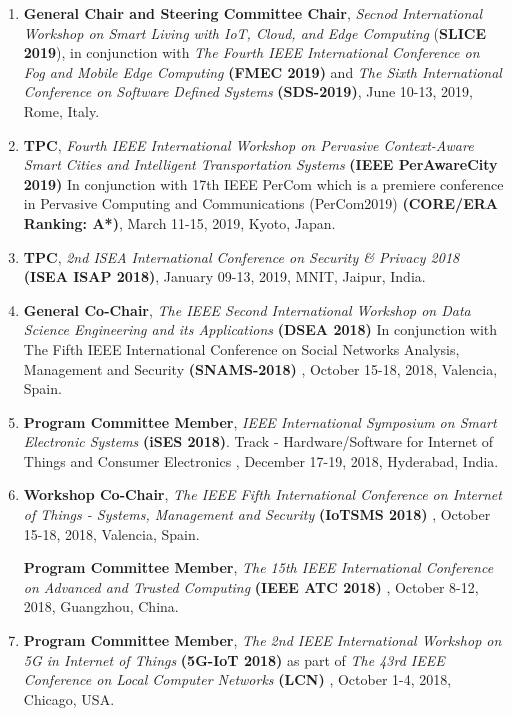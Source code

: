 \begin{enumerate}
\item
\textbf{General Chair and Steering Committee Chair}, \textit{Secnod International Workshop on Smart Living with IoT, Cloud, and Edge Computing }(\textbf{SLICE 2019}), in conjunction with \textit{The Fourth IEEE International Conference on Fog and Mobile Edge Computing} \textbf{(FMEC 2019)} and \textit{The Sixth International Conference on Software Defined Systems} \textbf{(SDS-2019)}, June 10-13, 2019, Rome, Italy.

\item
\textbf{TPC}, \textit{Fourth IEEE International Workshop on Pervasive Context-Aware Smart Cities and Intelligent Transportation Systems} \textbf{(IEEE PerAwareCity 2019)} In conjunction with 17th IEEE PerCom which is a premiere conference in Pervasive Computing and Communications (PerCom2019) \textbf{(CORE/ERA Ranking: A*)}, March 11-15, 2019, Kyoto, Japan.

\item
\textbf{TPC}, \textit{2nd ISEA International Conference on Security \& Privacy 2018} \textbf{(ISEA ISAP 2018)}, January 09-13, 2019, MNIT, Jaipur, India.

\item
\textbf{General Co-Chair}, \textit{The IEEE Second International Workshop on Data Science Engineering and its Applications} \textbf{(DSEA 2018)} In conjunction with 
The Fifth IEEE International Conference on Social Networks Analysis, Management and Security \textbf{(SNAMS-2018) }, October 15-18, 2018, Valencia, Spain.

\item
\textbf{Program Committee Member}, \textit{IEEE International Symposium on Smart Electronic Systems} \textbf{(iSES 2018)}. Track - Hardware/Software for Internet of Things and Consumer Electronics , December 17-19, 2018, Hyderabad, India.

\item
\textbf{Workshop Co-Chair}, \textit{The IEEE Fifth International Conference on Internet of Things - Systems, Management and Security} \textbf{(IoTSMS 2018)} , October 15-18, 2018, Valencia, Spain.

\textbf{Program Committee Member}, \textit{The 15th IEEE International Conference on Advanced and Trusted Computing} \textbf{(IEEE ATC 2018)} , October 8-12, 2018, Guangzhou, China. %

\item
\textbf{Program Committee Member}, \textit{The 2nd IEEE International Workshop on 5G in Internet of Things} \textbf{(5G-IoT 2018)} as part of \textit{The 43rd IEEE Conference on Local Computer Networks} \textbf{(LCN)} , October 1-4, 2018, Chicago, USA. %


\end{enumerate}
